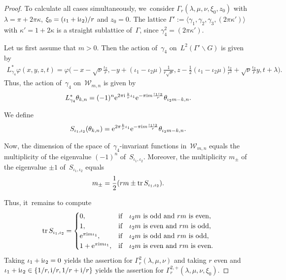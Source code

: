 \documentclass[10pt,a4paper]{amsart}
\newcommand\ph{\varphi}
\newcommand{\tr}{\mathop{{\rm tr}}}
\numberwithin{equation}{section}
\begin{document}
\begin{proof}
To calculate all cases simultaneously, we~consider $\Gamma_r(\lambda,\mu,\nu,\xi_0,z_0)$ with $\lambda=\pi+2\pi\kappa$, $\xi_0=(\iota_1+{\rm i}\iota_2)/r$ and $z_0=0$.
The lattice $\Gamma':=\langle\gamma_1,\gamma_2,\gamma_3,(2\pi\kappa')\rangle$ with $\kappa'=1+2\kappa$ is a straight sublattice of~$\Gamma$, since $\gamma_4^2=(2\pi \kappa')$.

Let us first assume that $m>0$. Then the action of~$\gamma_4$ on~$L^2(\Gamma'\backslash G)$ is given by
\begin{gather*}
L^*_{\gamma_4} \ph(x,y,z,t)=\ph\bigg(\!{-}x-\sqrt\nu \frac{\iota_2}{r},-y+(\iota_1-\iota_2\mu )\frac 1{r\sqrt\nu },z-\frac12(\iota_1-\iota_2\mu)\frac{\iota_2}{r^2}+\sqrt\nu \frac{\iota_2}{r} y,t+\lambda\!\bigg).
\end{gather*}
Thus, the action of~$\gamma_4$ on~${\mathcal W}_{m,n}$ is given by
\begin{gather*}
L^*_{\gamma_4}\theta_{k,n}=(-1)^n{\rm e}^{2\pi {\rm i}\,\frac{k}{r}\iota_1}{\rm e}^{-\pi {\rm i} m\frac{\iota_1\iota_2}{r}}\theta_{\iota_2m-k,n}.
\end{gather*}

We define
\begin{gather*}
S_{\iota_1,\iota_2}(\theta_{k,n})={\rm e}^{2\pi\frac{k}{r}\iota_1}{\rm e}^{-\pi {\rm i} m\frac{\iota_1\iota_2}{r}}\theta_{\iota_2m-k,n}.
\end{gather*}

Now, the dimension of the space of~$\gamma_4$-invariant functions in~${\mathcal W}_{m,n}$ equals the multiplicity of the eigenvalue $(-1)^n$ of~$S_{\iota_1,\iota_2}$.
Moreover, the multiplicity $m_{\pm }$ of the eigenvalue $\pm 1$ of~$S_{\iota_1,\iota_2}$ equals
\begin{gather*}
m_{\pm }=\frac{1}{2}(rm\pm\tr S_{\iota_1,\iota_2}).
\end{gather*}

Thus, it~remains to compute
\begin{gather*}
\tr S_{\iota_1,\iota_2}=
\begin{cases}
 0, &\text{if\quad $\iota_2m$ is odd and $rm$ is even},
 \\%
 1, &\text{if\quad $\iota_2m$ is even and $rm$ is odd},
 \\%
 {\rm e}^{\pi {\rm i} m\iota_1}, &\text{if\quad $\iota_2m$ is odd and $rm$ is odd},
 \\%
 1+{\rm e}^{\pi {\rm i} m\iota_1}, &\text{if\quad $\iota_2m$ is even and $rm$ is even}.
\end{cases}
\end{gather*}
Taking $\iota_1+{\rm i}\iota_2=0$ yields the assertion for $\Gamma^2_r(\lambda,\mu,\nu)$ and taking $r$ even and $\iota_1+{\rm i}\iota_2\in\{1/r,{\rm i}/r,1/r+{\rm i}/r\}$ yields the assertion for $\Gamma^{2,+}_r(\lambda,\mu,\nu,\xi_0)$.


\end{proof}
\end{document}
